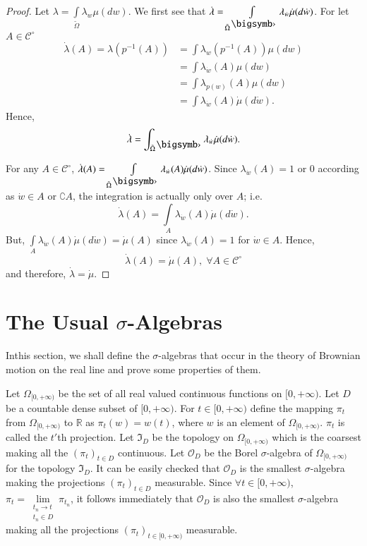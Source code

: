 \begin{proof}
Let $\lambda = \int\limits_{\tilde{\Omega}} \lambda_w \mu (dw)$. We first see that
$\dot{\lambda} = \int\limits_{\tilde{\Omega}^\bigdot}
\lambda_{\dot{w}} \dot{\mu} (d\dot{w})$. For let $A \in
\mathscr{C}^\circ$
\begin{align*}
\dot{\lambda} (A) = \lambda (p^{-1} (A)) & = \int \lambda_w (p^{-1}
(A)) \mu(dw)\\
& = \int \lambda_{\dot{w}} (A) \mu (dw)\\
& = \int \lambda_{p(w)} (A) \mu (dw)\\
& = \int \lambda_{\dot{w}} (A) \dot{\mu} (d\dot{w}).
\end{align*} 
Hence,
$$
\dot{\lambda} = \int_{\tilde{\Omega}^\bigdot} \lambda_{\dot{w}}
\dot{\mu} (d\dot{w}). 
$$

For any $A \in \mathscr{C}^\circ$, $\dot{\lambda}(A) =
\int\limits_{\tilde{\Omega}^\bigdot} \lambda_{\dot{w}} (A) \dot{\mu}
(d\dot{w})$. Since $\lambda_{\dot{w}}(A) =1$ or $0$ according as
$\dot{w} \in A$ or $\complement A$, the integration is actually only
over $A$; i.e.
$$
\dot{\lambda} (A) = \int\limits_A \lambda_{\dot{w}} (A) \dot{\mu}
(d\dot{w}). 
$$
But, $\int\limits_A \lambda_{\dot{w}} (A) \dot{\mu} (d\dot{w}) =
\dot{\mu}(A)$  since $\lambda_{\dot{w}} (A) =1$ for $\dot{w} \in
A$. Hence, 
$$
\dot{\lambda} (A) = \dot{\mu} (A), \; \forall A \in \mathscr{C}^\circ
$$
and therefore, $\dot{\lambda} = \dot{\mu}$. 
\end{proof}

\section{The Usual $\sigma$-Algebras}\label{part2:chap7:sec4}

In\pageoriginale this section, we shall define the $\sigma$-algebras
that occur in the theory of Brownian motion on the real line and prove
some properties of them.

Let $\Omega_{[0,+\infty)}$ be  the set of all real valued continuous
  functions on $[0, + \infty)$. Let $D$ be a countable dense subset of
    $[0,+\infty)$. For $t \in [0,+\infty)$ define the mapping $\pi_t$
        from $\Omega_{[0,+\infty)}$ to $\mathbb{R}$ as $\pi_t(w) =
          w(t)$, where $w$ is an element of
          $\Omega_{[0,+\infty)}$. $\pi_t$ is called the $t'$th
            projection. Let $\mathfrak{I}_D$ be the topology on
            $\Omega_{[0,+\infty)}$ which is the coarsest making all
              the $(\pi_t)_{t \in D}$ continuous. Let $\mathscr{O}_D$ be
              the Borel $\sigma$-algebra of $\Omega_{[0,+\infty)}$ for
                the topology $\mathfrak{I}_D$. It can be easily
                checked that $\mathscr{O}_D$ is the smallest
                $\sigma$-algebra making the projections $(\pi_t)_{t\in
                D}$ measurable. Since $\forall t \in [0,+\infty)$,
                  $\pi_t = \lim\limits_{\substack{t_n\to t\\t_n \in
                      D}} \pi_{t_n}$, it follows immediately that
                  $\mathscr{O}_D$ is also the smallest
                  $\sigma$-algebra making all the projections
                  $(\pi_t)_{t \in[0,+\infty)}$ measurable.


